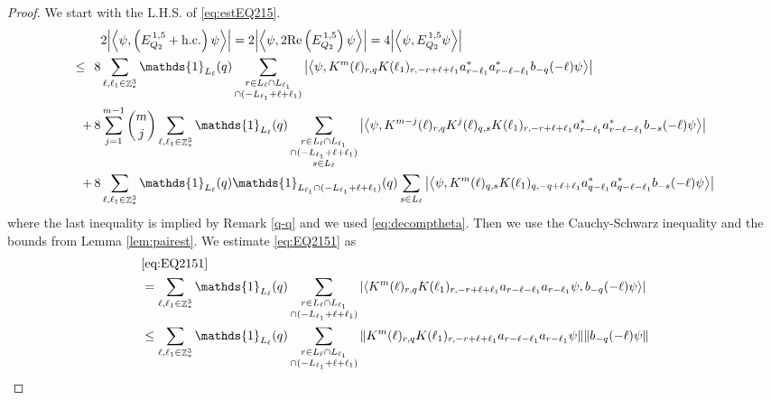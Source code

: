 \documentclass[sn-mathphys, Numbered ,a4paper]{sn-jnl}%
\DeclareMathOperator{\Z}{\mathbb{Z}}
\newcommand{\eva}[1]{\left\langle #1 \right\rangle}
\theoremstyle{plain}
\theoremstyle{definition}
\theoremstyle{remark}
\theoremstyle{plain}
\theoremstyle{definition}
\theoremstyle{remark}
\begin{document}
\begin{proof}
We start with the L.H.S. of \eqref{eq:estEQ215}.
\begin{align}
    &2\abs{\eva{\psi,\left(E^{\,1,5}_{Q_2}+\mathrm{h.c.}\right) \psi }} = 2\abs{\eva{\psi,2\mathrm{Re}\left(E^{\,1,5}_{Q_2}\right) \psi }} = 4\abs{\eva{\psi, E^{\,1,5}_{Q_2} \psi }}\nonumber\\
    \leq\,\;8& \sum\limits_{\ell, \ell_1\in \Z^3_*} \mathds{1}_{L_{\ell}}(q) \sum\limits_{\substack{r\in L_{\ell} \cap L_{\ell_1} \\ \cap (-L_{\ell_1}+\ell+\ell_1)}} \abs{\eva{\psi,  K^m(\ell)_{r,q} K(\ell_1)_{r,-r+\ell+\ell_1}  a^*_{r-\ell_1}a^*_{r-\ell-\ell_1}b_{-q}(-\ell)\psi }} \label{eq:EQ2151}\\
    +\,8& \sum\limits_{j=1}^{m-1} {{m}\choose j} \sum\limits_{\ell, \ell_1\in \Z^3_*}\mathds{1}_{L_{\ell}}(q) \sum\limits_{\substack{r\in L_{\ell} \cap L_{\ell_1}\\ \cap (-L_{\ell_1}+\ell+\ell_1)\\ s \in L_{\ell}}}  \abs{\eva{\psi, K^{m-j}(\ell)_{r,q} K^j(\ell)_{q,s} K(\ell_1)_{r,-r+\ell+\ell_1}  a^*_{r-\ell_1}a^*_{r-\ell-\ell_1}b_{-s}(-\ell) \psi }} \label{eq:EQ2152}\\
    +\,8&\sum\limits_{\ell, \ell_1\in \Z^3_*} \mathds{1}_{L_{\ell}}(q) \mathds{1}_{L_{\ell_1}\cap (-L_{\ell_1}+\ell+\ell_1)}(q) \sum\limits_{ s \in L_{\ell}} \abs{\eva{\psi, K^m(\ell)_{q,s} K(\ell_1)_{q,-q+\ell+\ell_1}  a^*_{q-\ell_1} a^*_{q-\ell-\ell_1} b_{-s}(-\ell) \psi }} \label{eq:EQ2153}
\end{align}
where the last inequality is implied by Remark \ref{q-q} and we used \eqref{eq:decomptheta}.
Then we use the Cauchy-Schwarz inequality and the bounds from Lemma \ref{lem:pairest}.
We estimate \eqref{eq:EQ2151} as
\begin{align}
    &\eqref{eq:EQ2151}\nonumber\\
    &= \sum\limits_{\ell, \ell_1\in \Z^3_*} \mathds{1}_{L_{\ell}}(q) \sum\limits_{\substack{r\in L_{\ell} \cap L_{\ell_1} \\ \cap (-L_{\ell_1}+\ell+\ell_1)}} \abs{\eva{K^m(\ell)_{r,q} K(\ell_1)_{r,-r+\ell+\ell_1}  a_{r-\ell-\ell_1}  a_{r-\ell_1} \psi,  b_{-q}(-\ell) \psi}}\nonumber\\
	&\leq \sum\limits_{\ell, \ell_1\in \Z^3_*} \mathds{1}_{L_{\ell}}(q) \sum\limits_{\substack{r\in L_{\ell} \cap L_{\ell_1} \\ \cap (-L_{\ell_1}+\ell+\ell_1)}} \norm{K^m(\ell)_{r,q} K(\ell_1)_{r,-r+\ell+\ell_1} a_{r-\ell-\ell_1} a_{r-\ell_1} \psi}\norm{  b_{-q}(-\ell) \psi}\nonumber\\

\end{align}
\end{proof}
\end{document}
